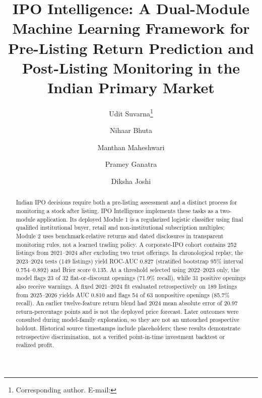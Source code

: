 \documentclass[runningheads]{llncs}
\begin{document}
\title{IPO Intelligence: A Dual-Module Machine Learning Framework for Pre-Listing Return Prediction and Post-Listing Monitoring in the Indian Primary Market}
\author{Udit Suvarna\thanks{Corresponding author. E-mail: } \and Nihaar Bhuta \and Manthan Maheshwari \and Pramey Ganatra \and Diksha Joshi}
\maketitle
\begin{abstract}
Indian IPO decisions require both a pre-listing assessment and a distinct process for monitoring a stock after listing. IPO Intelligence implements these tasks as a two-module application. Its deployed Module 1 is a regularized logistic classifier using final qualified institutional buyer, retail and non-institutional subscription multiples; Module 2 uses benchmark-relative returns and dated disclosures in transparent monitoring rules, not a learned trading policy. A corporate-IPO cohort contains 252 listings from 2021--2024 after excluding two trust offerings. In chronological replay, the 2023--2024 tests (149 listings) yield ROC-AUC 0.827 (stratified bootstrap 95\% interval 0.754--0.892) and Brier score 0.135. At a threshold selected using 2022--2023 only, the model flags 23 of 32 flat-or-discount openings (71.9\% recall), while 31 positive openings also receive warnings. A fixed 2021--2024 fit evaluated retrospectively on 189 listings from 2025--2026 yields AUC 0.810 and flags 54 of 63 nonpositive openings (85.7\% recall). An earlier twelve-feature return blend had 2024 mean absolute error of 20.97 return-percentage points and is not the deployed price forecast. Later outcomes were consulted during model-family exploration, so they are not an untouched prospective holdout. Historical source timestamps include placeholders; these results demonstrate retrospective discrimination, not a verified point-in-time investment backtest or realized profit.
\end{abstract}
\end{document}
